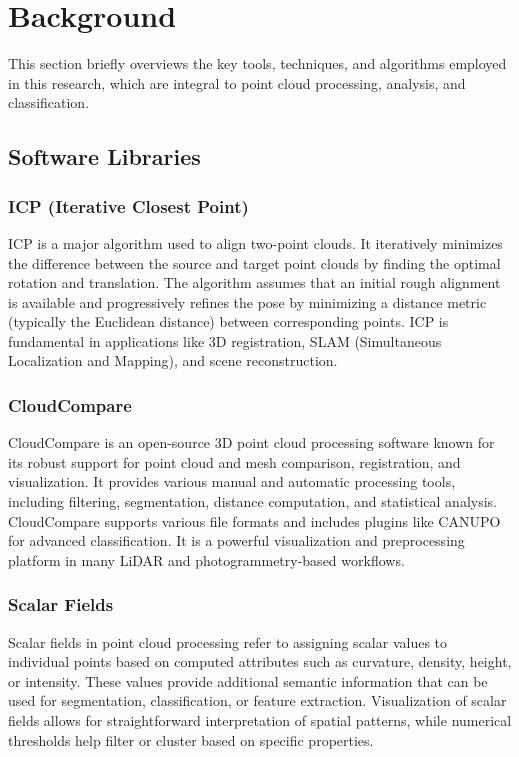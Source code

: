 \documentclass[../report.tex]{subfiles}
\begin{document}
    \section{Background}
    \label{sec:background}
    This section briefly overviews the key tools, techniques, and algorithms employed in this research, which are integral to point cloud processing, analysis, and classification.
    \subsection{Software Libraries}
    \subsubsection{\textbf{ICP} (Iterative Closest Point)}
    ICP is a major algorithm used to align two-point clouds. It iteratively minimizes the difference between the source and target point clouds by finding the optimal rotation and translation. The algorithm assumes that an initial rough alignment is available and progressively refines the pose by minimizing a distance metric (typically the Euclidean distance) between corresponding points. ICP is fundamental in applications like 3D registration, SLAM (Simultaneous Localization and Mapping), and scene reconstruction.\cite{ICP}
    
    \subsubsection{\textbf{CloudCompare}}
    
    CloudCompare\cite{ColoudCompare} is an open-source 3D point cloud processing software known for its robust support for point cloud and mesh comparison, registration, and visualization. It provides various manual and automatic processing tools, including filtering, segmentation, distance computation, and statistical analysis. CloudCompare supports various file formats and includes plugins like CANUPO for advanced classification. It is a powerful visualization and preprocessing platform in many LiDAR and photogrammetry-based workflows.
    
    \subsubsection{\textbf{Scalar Fields}}
    
    Scalar fields in point cloud processing refer to assigning scalar values to individual points based on computed attributes such as curvature, density, height, or intensity. These values provide additional semantic information that can be used for segmentation, classification, or feature extraction. Visualization of scalar fields allows for straightforward interpretation of spatial patterns, while numerical thresholds help filter or cluster based on specific properties.
    
\end{document}
